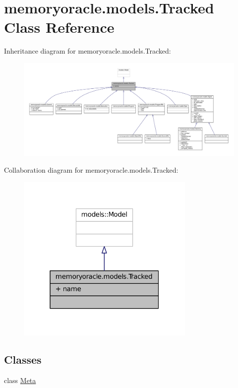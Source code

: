 \hypertarget{classmemoryoracle_1_1models_1_1Tracked}{}\section{memoryoracle.\+models.\+Tracked Class Reference}
\label{classmemoryoracle_1_1models_1_1Tracked}


Inheritance diagram for memoryoracle.\+models.\+Tracked\+:\nopagebreak
\begin{figure}[H]
\begin{center}
\leavevmode
\includegraphics[width=350pt]{classmemoryoracle_1_1models_1_1Tracked__inherit__graph}
\end{center}
\end{figure}


Collaboration diagram for memoryoracle.\+models.\+Tracked\+:\nopagebreak
\begin{figure}[H]
\begin{center}
\leavevmode
\includegraphics[width=244pt]{classmemoryoracle_1_1models_1_1Tracked__coll__graph}
\end{center}
\end{figure}
\subsection*{Classes}
\begin{DoxyCompactItemize}
\item 
class \hyperlink{classmemoryoracle_1_1models_1_1Tracked_1_1Meta}{Meta}
\end{DoxyCompactItemize}

